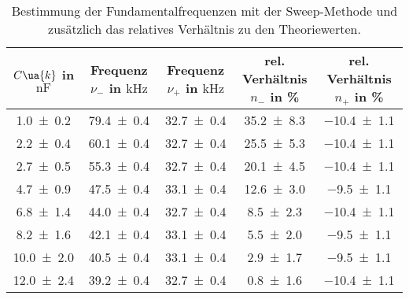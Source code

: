 \begin{table} 
\centering 
\caption{Bestimmung der Fundamentalfrequenzen mit der Sweep-Methode und zusätzlich das relatives Verhältnis zu den Theoriewerten.} 
\label{teilc_schwingungen_prak_theo} 
\begin{tabular}{S S S S S } 
\toprule  
{$C\ua{k}$ in $\si{\nano\farad}$} & {Frequenz $\nu_-$ in $\si{\kilo\hertz}$} & {Frequenz $\nu_+$ in $\si{\kilo\hertz}$ }& {rel. Verhältnis $n_{-}$ in \%} & {rel. Verhältnis $n_+$ in \%}  \\ 
\midrule  
 \num{1.0\pm0.2} & \num{79.4\pm0.4} & \num{32.7\pm0.4} & \num{35.2\pm8.3} & \num{-10.4\pm1.1}\\ 
\num{2.2\pm0.4} & \num{60.1\pm0.4} & \num{32.7\pm0.4} & \num{25.5\pm5.3} & \num{-10.4\pm1.1}\\ 
\num{2.7\pm0.5} & \num{55.3\pm0.4} & \num{32.7\pm0.4} & \num{20.1\pm4.5} & \num{-10.4\pm1.1}\\ 
\num{4.7\pm0.9} & \num{47.5\pm0.4} & \num{33.1\pm0.4} & \num{12.6\pm3.0} & \num{-9.5\pm1.1}\\ 
\num{6.8\pm1.4} & \num{44.0\pm0.4} & \num{32.7\pm0.4} & \num{8.5\pm2.3} & \num{-10.4\pm1.1}\\ 
\num{8.2\pm1.6} & \num{42.1\pm0.4} & \num{33.1\pm0.4} & \num{5.5\pm2.0} & \num{-9.5\pm1.1}\\ 
\num{10.0\pm2.0} & \num{40.5\pm0.4} & \num{33.1\pm0.4} & \num{2.9\pm1.7} & \num{-9.5\pm1.1}\\ 
\num{12.0\pm2.4} & \num{39.2\pm0.4} & \num{32.7\pm0.4} & \num{0.8\pm1.6} & \num{-10.4\pm1.1}\\ 
\bottomrule 
\end{tabular} 
\end{table}